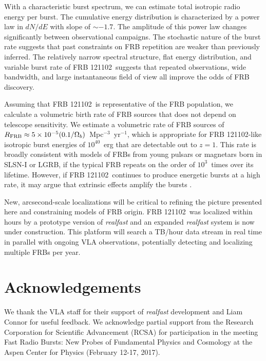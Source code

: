 \documentclass[twocolumn]{aastex61}
\newcommand{\frb}{FRB 121102}
\begin{document}
With a characteristic burst spectrum, we can estimate total isotropic radio energy per burst. The cumulative energy distribution is characterized by a power law in $dN/dE$ with slope of $\sim-1.7$. The amplitude of this power law changes significantly between observational campaigns. The stochastic nature of the burst rate suggests that past constraints on FRB repetition are weaker than previously inferred. The relatively narrow spectral structure, flat energy distribution, and variable burst rate of \frb\ suggests that repeated observations, wide bandwidth, and large instantaneous field of view all improve the odds of FRB discovery.

Assuming that \frb\ is representative of the FRB population, we calculate a volumetric birth rate of FRB sources that does not depend on telescope sensitivity. We estimate a volumetric rate of FRB sources of $R_{\rm{FRB}} \approx 5\times10^{-5} (0.1/\Omega_b)$\ Mpc$^{-3}$\ yr$^{-1}$, which is appropriate for \frb-like isotropic burst energies of $10^{40}$\ erg that are detectable out to $z=1$. This rate is broadly consistent with models of FRBs from young pulsars or magnetars born in SLSN-I or LGRB, if the typical FRB repeats on the order of $10^3$\ times over its lifetime. However, if \frb\ continues to produce energetic bursts at a high rate, it may argue that extrinsic effects amplify the bursts \citep{2017arXiv170306580C}.

New, arcsecond-scale localizations will be critical to refining the picture presented here and constraining models of FRB origin. \frb\ was localized within hours by a prototype version of \textit{realfast} and an expanded \textit{realfast} system is now under construction. This platform will search a TB/hour data stream in real time in parallel with ongoing VLA observations, potentially detecting and localizing multiple FRBs per year.



\section*{Acknowledgements}
We thank the VLA staff for their support of \textit{realfast} development and Liam Connor for useful feedback. We acknowledge partial support from the Research Corporation for Scientific Advancement (RCSA) for participation in the meeting Fast Radio Bursts: New Probes of Fundamental Physics and Cosmology at the Aspen Center for Physics (February 12-17, 2017).
\end{document}
